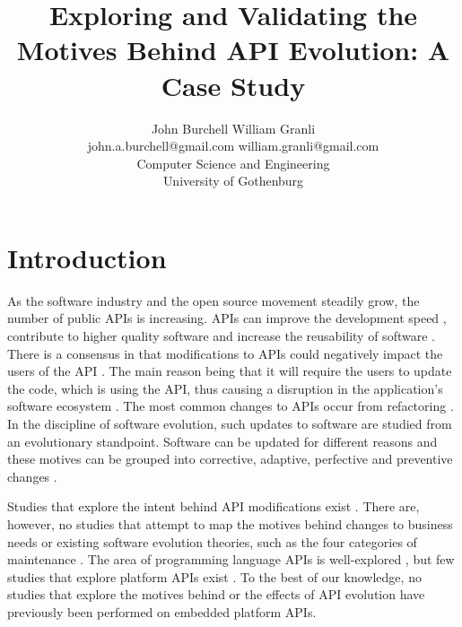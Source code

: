 \documentclass[10pt,twocolumn]{article}
\title{Exploring and Validating the Motives Behind API Evolution: A Case Study}
\begin{document}


\author{John Burchell \qquad William Granli \\
		john.a.burchell@gmail.com \qquad william.granli@gmail.com \\
		Computer Science and Engineering  \\
		University of Gothenburg }


\maketitle





\section{Introduction}
As the software industry and the open source movement steadily grow, the number of public APIs is increasing. APIs can improve the development speed \cite{stylos2006comparing}, contribute to higher quality software \cite{stylos2006comparing} and increase the reusability of software \cite{afonso2012evaluating}. There is a consensus in that modifications to APIs could negatively impact the users of the API \cite{google_talk} \cite{mcdonnell2013empirical} \cite{robbes2012developers} \cite{henning2007api} \cite{robbes2012developers}. The main reason being that it will require the users to update the code, which is using the API, thus causing a disruption in the application's software ecosystem \cite{messerschmitt2005software}. The most common changes to APIs occur from refactoring \cite{dig2005role} \cite{xing2006refactoring}. 
In the discipline of software evolution, such updates to software are studied from an evolutionary standpoint. Software can be updated for different reasons and these motives can be grouped into corrective, adaptive, perfective and preventive changes \cite{lientz1980software} \cite{iso}. 

Studies that explore the intent behind API modifications exist \cite{hou2011exploring}. There are, however, no studies that attempt to map the motives behind changes to business needs or existing software evolution theories, such as the four categories of maintenance \cite{lientz1980software} \cite{iso}. The area of programming language APIs is well-explored \cite{hou2011exploring} \cite{shi2011empirical}, but few studies that explore platform APIs exist \cite{robbes2012developers}. To the best of our knowledge, no studies that explore the motives behind or the effects of API evolution have previously been performed on embedded platform APIs. 
\end{document}
